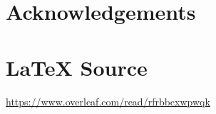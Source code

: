 \documentclass{article}
\theoremstyle{definition}
\begin{document}
\section*{Acknowledgements}
%
%
\section*{\LaTeX \hspace{0.10 mm} Source}
\url{https://www.overleaf.com/read/rfrbbcxwpwqk}
%
%
%


%
%
\end{document}
